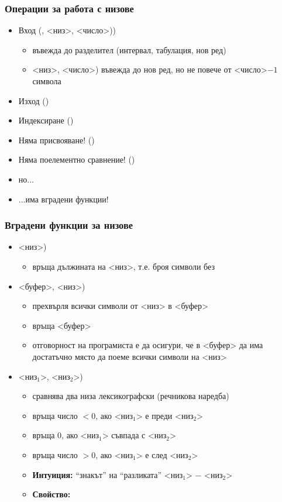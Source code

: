 \documentclass[alsotrans]{beamerswitch}
\newcommand{\s}{<низ>\xspace}
\renewcommand{\ss}[1]{<низ$_{#1}$>\xspace}
\renewcommand{\b}{<буфер>\xspace}
\begin{document}
\begin{frame}
  \frametitle{Операции за работа с низове}

  \begin{itemize}[<+->]
  \item Вход (\tta{>{}>}, \s, <число>\tta))
    \begin{itemize}
    \item \tta{>{}>} въвежда до разделител (интервал, табулация, нов ред)
    \item {}\s, <число>\tta) въвежда до нов ред, но не повече от <число>$-1$ символа
    \end{itemize}

  \item Изход (\tta{<{}<})
  \item Индексиране (\tta{[]})
  \item Няма присвояване! ()
  \item Няма поелементно сравнение! ()
  \item но...
  \item ...има вградени функции!
  \end{itemize}
\end{frame}

\begin{frame}
  \frametitle{Вградени функции за низове}


  \begin{itemize}[<+->]
  \item {}\s\tta)
    \begin{itemize}
    \item връща дължината на \s, т.е. броя символи без \term
    \end{itemize}
  \item {}\b, \s\tta)
    \begin{itemize}
    \item прехвърля всички символи от \s в \b
    \item връща \b
    \item \alert{отговорност на програмиста е да осигури, че в \b да има достатъчно място да поеме всички символи на \s}
    \end{itemize}
  \item {}\ss1, \ss2\tta)
    \begin{itemize}
    \item сравнява два низа \alert{лексикографски} (речникова наредба)
    \item връща число $<0$, ако \ss1 е преди \ss2
    \item връща 0, ако \ss1 съвпада с \ss2
    \item връща число $>0$, ако \ss1 е след \ss2
    \item \textbf{Интуиция:} ``знакът'' на ``разликата'' \ss1 $-$ \ss2
    \item \textbf{Свойство:} 
    \end{itemize}
  \end{itemize}
\end{frame}
\end{document}
